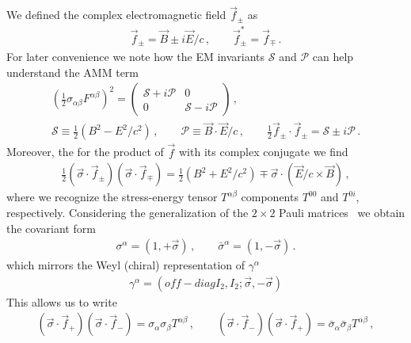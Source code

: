 \documentclass[addchapnum]{ws-rv961x669} %
\begin{document}
We defined the complex electromagnetic field $\vec{f}_{\pm}$ as
\begin{align}
    \vec{f}_{\pm}=\vec{B}\pm i\vec{E}/c\,,\qquad
    \vec{f}_{\pm}^{*}=\vec{f}_{\mp}\,.
\end{align}
For later convenience we note how the EM invariants $\mathcal{S}$ and $\mathcal{P}$ can help understand the AMM term 
\begin{gather}
    \left(\frac{1}{2}\sigma_{\alpha\beta}F^{\alpha\beta}\right)^{2}=
    \begin{pmatrix}
        \mathcal{S}+i\mathcal{P} & 0\\
        0 & \mathcal{S}-i\mathcal{P}
    \end{pmatrix}\,,\\
    \mathcal{S}\equiv\frac{1}{2}\left(B^{2}-E^{2}/c^{2}\right)\,,\qquad
    \mathcal{P}\equiv\vec{B}\cdot\vec{E}/c\,,\qquad
    \frac{1}{2}\vec{f}_{\pm}\cdot\vec{f}_{\pm}=\mathcal{S}\pm i\mathcal{P}\,.
\end{gather}
Moreover, the for the product of $\vec{f}$ with its complex conjugate we find
\begin{align}
        \label{cross:1}
        \frac{1}{2}\left(\vec{\sigma}\cdot\vec{f}_{\pm}\right)\left(\vec{\sigma}\cdot\vec{f}_{\mp}\right)=\frac{1}{2}\left(B^{2}+E^{2}/c^{2}\right)\mp\vec{\sigma}\cdot\left(\vec{E}/c\times\vec{B}\right)\,,
\end{align}
where we recognize the  stress-energy tensor $T^{\alpha\beta}$ components $T^{00}$ and $T^{0i}$, respectively.  Considering the generalization of the $2\times 2$ Pauli matrices~\cite{.} we obtain the covariant form 
\begin{align}       \label{cross:1a}    
        \sigma^{\alpha}=(1,+\vec{\sigma})\,,\qquad
        \bar\sigma^{\alpha}=(1,-\vec{\sigma})\,.
\end{align}
which mirrors the Weyl (chiral) representation of $\gamma^\alpha$
\begin{align}       \label{cross:1c}    
\gamma^\alpha =(off-diag I_2,I_2;\vec\sigma,-\vec\sigma)
\end{align}
This allows us to write 
        \begin{align}
        \label{cross:2}        \left(\vec{\sigma}\cdot\vec{f}_{+}\right)\left(\vec{\sigma}\cdot\vec{f}_{-}\right)=\sigma_{\alpha}\sigma_{\beta}T^{\alpha\beta}\,,\qquad
        \left(\vec{\sigma}\cdot\vec{f}_{-}\right)\left(\vec{\sigma}\cdot\vec{f}_{+}\right)=\bar\sigma_{\alpha}\bar\sigma_{\beta}T^{\alpha\beta}\,,
\end{align}
\end{document}
